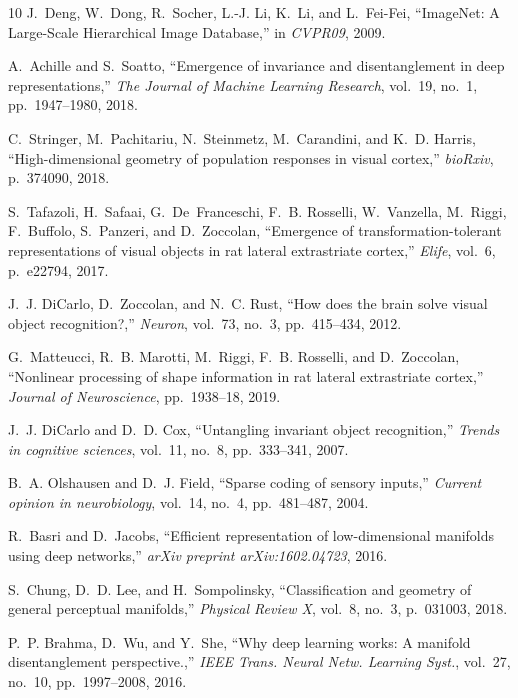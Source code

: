\documentclass{article}
\begin{document}
\begin{thebibliography}{10}
J.~Deng, W.~Dong, R.~Socher, L.-J. Li, K.~Li, and L.~Fei-Fei, ``{ImageNet: A
  Large-Scale Hierarchical Image Database},'' in {\em CVPR09}, 2009.

A.~Achille and S.~Soatto, ``Emergence of invariance and disentanglement in deep
  representations,'' {\em The Journal of Machine Learning Research}, vol.~19,
  no.~1, pp.~1947--1980, 2018.

C.~Stringer, M.~Pachitariu, N.~Steinmetz, M.~Carandini, and K.~D. Harris,
  ``High-dimensional geometry of population responses in visual cortex,'' {\em
  bioRxiv}, p.~374090, 2018.

S.~Tafazoli, H.~Safaai, G.~De~Franceschi, F.~B. Rosselli, W.~Vanzella,
  M.~Riggi, F.~Buffolo, S.~Panzeri, and D.~Zoccolan, ``Emergence of
  transformation-tolerant representations of visual objects in rat lateral
  extrastriate cortex,'' {\em Elife}, vol.~6, p.~e22794, 2017.

J.~J. DiCarlo, D.~Zoccolan, and N.~C. Rust, ``How does the brain solve visual
  object recognition?,'' {\em Neuron}, vol.~73, no.~3, pp.~415--434, 2012.

G.~Matteucci, R.~B. Marotti, M.~Riggi, F.~B. Rosselli, and D.~Zoccolan,
  ``Nonlinear processing of shape information in rat lateral extrastriate
  cortex,'' {\em Journal of Neuroscience}, pp.~1938--18, 2019.

J.~J. DiCarlo and D.~D. Cox, ``Untangling invariant object recognition,'' {\em
  Trends in cognitive sciences}, vol.~11, no.~8, pp.~333--341, 2007.

B.~A. Olshausen and D.~J. Field, ``Sparse coding of sensory inputs,'' {\em
  Current opinion in neurobiology}, vol.~14, no.~4, pp.~481--487, 2004.

R.~Basri and D.~Jacobs, ``Efficient representation of low-dimensional manifolds
  using deep networks,'' {\em arXiv preprint arXiv:1602.04723}, 2016.

S.~Chung, D.~D. Lee, and H.~Sompolinsky, ``Classification and geometry of
  general perceptual manifolds,'' {\em Physical Review X}, vol.~8, no.~3,
  p.~031003, 2018.

P.~P. Brahma, D.~Wu, and Y.~She, ``Why deep learning works: A manifold
  disentanglement perspective.,'' {\em IEEE Trans. Neural Netw. Learning
  Syst.}, vol.~27, no.~10, pp.~1997--2008, 2016.


\end{thebibliography}
\end{document}
